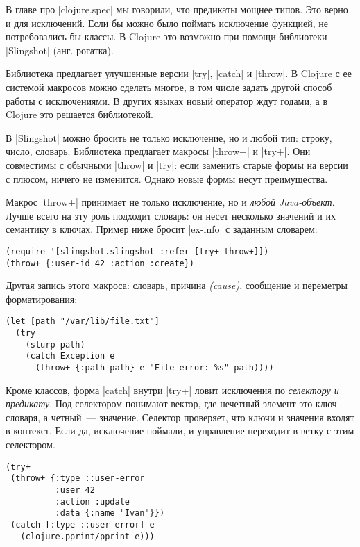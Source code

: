 В главе про \spverb|clojure.spec| мы говорили, что предикаты мощнее типов. Это
верно и для исключений. Если бы можно было поймать исключение функцией, не
потребовались бы классы. В Clojure это возможно при помощи библиотеки
\spverb|Slingshot| (анг. рогатка).

Библиотека предлагает улучшенные версии \spverb|try|, \spverb|catch| и
\spverb|throw|. В Clojure с ее системой макросов можно сделать многое, в том
числе задать другой способ работы с исключениями. В других языках новый оператор
ждут годами, а в Clojure это решается библиотекой.

В \spverb|Slingshot| можно бросить не только исключение, но и любой тип: строку,
число, словарь. Библиотека предлагает макросы \spverb|throw+| и
\spverb|try+|. Они совместимы с обычными \spverb|throw| и \spverb|try|: если
заменить старые формы на версии с плюсом, ничего не изменится. Однако новые
формы несут преимущества.

Макрос \spverb|throw+| принимает не только исключение, но и \emph{любой
  Java-объект}. Лучше всего на эту роль подходит словарь: он несет несколько
значений и их семантику в ключах. Пример ниже бросит \spverb|ex-info| с заданным
словарем:

\begin{verbatim}
(require '[slingshot.slingshot :refer [try+ throw+]])
(throw+ {:user-id 42 :action :create})
\end{verbatim}

Другая запись этого макроса: словарь, причина \emph{(cause)}, сообщение и
переметры форматирования:

\begin{verbatim}
(let [path "/var/lib/file.txt"]
  (try
    (slurp path)
    (catch Exception e
      (throw+ {:path path} e "File error: %s" path))))
\end{verbatim}

Кроме классов, форма \spverb|catch| внутри \spverb|try+| ловит исключения по
\emph{селектору и предикату}. Под селектором понимают вектор, где нечетный
элемент это ключ словаря, а четный~--- значение. Селектор проверяет, что ключи и
значения входят в контекст. Если да, исключение поймали, и управление переходит
в ветку с этим селектором.

\begin{verbatim}
(try+
 (throw+ {:type ::user-error
          :user 42
          :action :update
          :data {:name "Ivan"}})
 (catch [:type ::user-error] e
   (clojure.pprint/pprint e)))
\end{verbatim}

